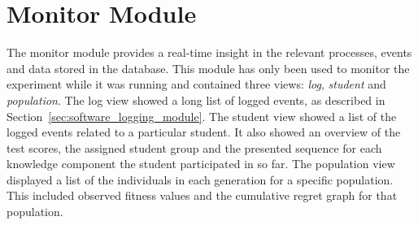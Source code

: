 \section{Monitor Module}
\label{sec:software_monitor_module}
The monitor module provides a real-time insight in the relevant processes,
events and data stored in the database. This module has only been used to
monitor the experiment while it was running and contained three views:
\emph{log}, \emph{student} and \emph{population}. The log view showed a long
list of logged events, as described in Section~\ref{sec:software_logging_module}.
The student view showed a list of the logged events related to a particular
student. It also showed an overview of the test scores, the assigned student
group and the presented sequence for each knowledge component the student
participated in so far. The population view displayed a list of the individuals
in each generation for a specific population. This included observed fitness
values and the cumulative regret graph for that population.
